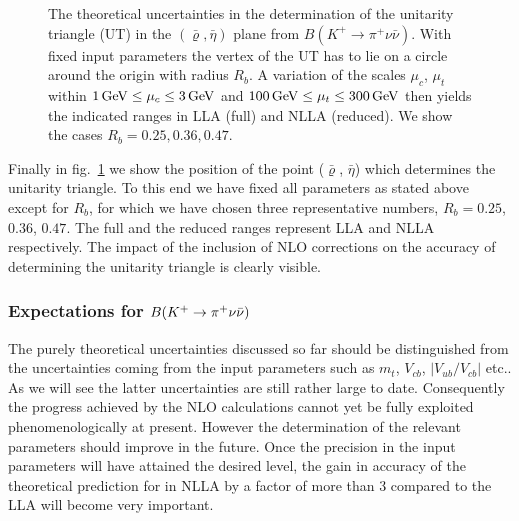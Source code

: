 \begin{figure}[hbt]
\vspace{0.10in}
\centerline{
\epsfysize=5in
 }
\vspace{0.08in}
\caption[]{
The theoretical uncertainties in the determination of the unitarity
triangle (UT) in the $(\bar\varrho, \bar\eta)$ plane from
$B(K^+\to\pi^+\nu\bar\nu)$. With fixed input parameters the vertex of
the UT has to lie on a circle around the origin with radius $R_b$.  A
variation of the scales $\mu_c$, $\mu_t$ within  $1\, {\rm GeV} \le \mu_c \le 3\, {\rm GeV}$
and $100\, {\rm GeV} \le \mu_t \le 300\, {\rm GeV}$ then yields the indicated ranges in LLA
(full) and NLLA (reduced). We show the cases $R_b=0.25, 0.36, 0.47$.
\label{fig:kpnunu:rhoetabar}}
\end{figure}

Finally in fig.\ \ref{fig:kpnunu:rhoetabar} we show the position of the
point ($\bar\varrho$, $\bar\eta$) which determines the unitarity
triangle.  To this end we have fixed all parameters as stated above
except for $R_b$, for which we have chosen three representative
numbers, $R_b=0.25$, $0.36$, $0.47$. The full and the reduced ranges
represent LLA and NLLA respectively. The impact of the inclusion of NLO
corrections on the accuracy of determining the unitarity triangle is
clearly visible.

\subsubsection{Expectations for $B(K^+ \to \pi^+\nu\bar\nu)$}
\label{sec:Kpnn:NumericalKp:EfB}
The purely theoretical uncertainties discussed so far should be
distinguished from the uncertainties coming from the input parameters
such as $m_t$, $V_{cb}$, $|V_{ub}/V_{cb}|$
etc.. As we will see the latter uncertainties are still rather large to
date. Consequently the progress achieved by the NLO calculations
\cite{buchallaburas:94} cannot yet be fully exploited
phenomenologically at present.  However the determination of the
relevant parameters should improve in the future. Once the precision in
the input parameters will have attained the desired level, the gain in
accuracy of the theoretical prediction for \kpnn in NLLA by a factor of
more than 3 compared to the LLA will become very important.

